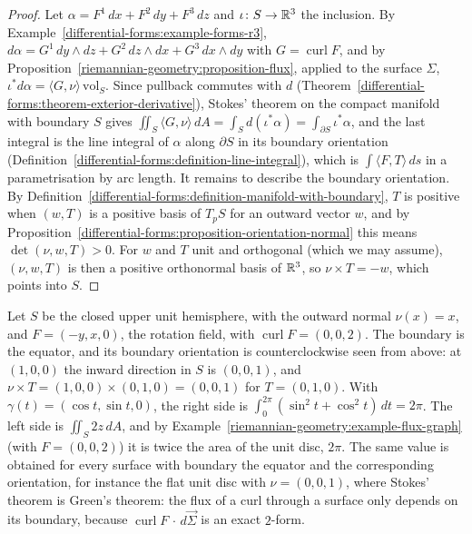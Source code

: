 \begin{proof}
Let $\alpha = F^1\,dx + F^2\,dy + F^3\,dz$ and $\iota \colon S \to \mathbb{R}^3$ the inclusion. By Example~\ref{differential-forms:example-forms-r3},
$d\alpha = G^1\,dy \wedge dz + G^2\,dz \wedge dx + G^3\,dx \wedge dy$ with $G = \operatorname{curl}F$, and by Proposition~\ref{riemannian-geometry:proposition-flux}, applied to the surface $\Sigma$,
$\iota^*d\alpha = \langle G, \nu\rangle\,\mathrm{vol}_S$. Since pullback commutes with $d$ (Theorem~\ref{differential-forms:theorem-exterior-derivative}), Stokes' theorem on the compact manifold with
boundary $S$ gives $\iint_S\langle G, \nu\rangle\,dA = \int_Sd(\iota^*\alpha) = \int_{\partial S}\iota^*\alpha$, and the last integral is the line integral of $\alpha$ along $\partial S$ in its boundary orientation
(Definition~\ref{differential-forms:definition-line-integral}), which is $\int\langle F, T\rangle\,ds$ in a parametrisation by arc length. It remains to describe the boundary orientation. By
Definition~\ref{differential-forms:definition-manifold-with-boundary}, $T$ is positive when $(w, T)$ is a positive basis of $T_pS$ for an outward vector $w$, and by
Proposition~\ref{differential-forms:proposition-orientation-normal} this means $\det(\nu, w, T) > 0$. For $w$ and $T$ unit and orthogonal (which we may assume), $(\nu, w, T)$ is then a positive orthonormal basis of
$\mathbb{R}^3$, so $\nu \times T = -w$, which points into $S$.
\end{proof}

\begin{example}\label{riemannian-geometry:example-stokes-hemisphere}
Let $S$ be the closed upper unit hemisphere, with the outward normal $\nu(x) = x$, and $F = (-y, x, 0)$, the rotation field, with $\operatorname{curl}F = (0, 0, 2)$. The boundary is the equator, and its
boundary orientation is counterclockwise seen from above: at $(1, 0, 0)$ the inward direction in $S$ is $(0, 0, 1)$, and $\nu \times T = (1, 0, 0) \times (0, 1, 0) = (0, 0, 1)$ for $T = (0, 1, 0)$. With
$\gamma(t) = (\cos t, \sin t, 0)$, the right side is $\int_0^{2\pi}(\sin^2t + \cos^2t)\,dt = 2\pi$. The left side is $\iint_S2z\,dA$, and by Example~\ref{riemannian-geometry:example-flux-graph} (with
$F = (0, 0, 2)$) it is twice the area of the unit disc, $2\pi$. The same value is obtained for every surface with boundary the equator and the corresponding orientation, for instance the flat unit disc
with $\nu = (0, 0, 1)$, where Stokes' theorem is Green's theorem: the flux of a curl through a surface only depends on its boundary, because $\operatorname{curl}F\,\cdot\,d\vec\Sigma$ is an exact $2$-form.
\end{example}

